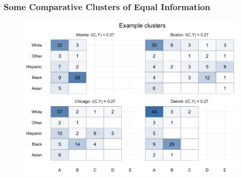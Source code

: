 \documentclass{beamer}
\begin{document}
	\begin{frame}[t]\frametitle{Some Comparative Clusters of Equal Information}
	    \begin{figure}
	    	\centering
	    	\includegraphics[width=\textwidth]{figs/example_clusters.png}
	    \end{figure}
	\end{frame}
\end{document}
